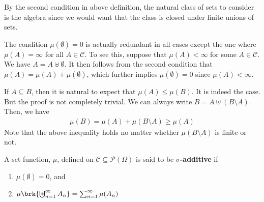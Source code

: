 \documentclass[thmcnt=section, 12pt, color=purple]{my-elegantbook}
\begin{document}
By the second condition in above definition, 
the natural class of sets to consider
is the algebra since we 
would want that the class is closed under finite unions of sets. 

\begin{note}
	The condition $\mu(\emptyset) = 0$
	is actually redundant in all cases except the one
	where $\mu(A) = \infty$ for all $A \in \mathcal{C}$.
	To see this, suppose that $\mu(A) < \infty$
	for some $A \in \mathcal{C}$.
	We have $A = A \uplus \emptyset$.
	It then follows from the second condition
	that $\mu(A) = \mu(A) + \mu(\emptyset)$,
	which further implies $\mu(\emptyset) = 0$
	since $\mu(A) < \infty$.
\end{note}

If $A \subseteq B$,
then it is natural to expect that $\mu(A) \leq \mu(B)$.
It is indeed the case.
But the proof is not completely trivial.
We can always write $B = A \uplus (B \setminus A)$.
Then, we have 
\begin{align*}
	\mu(B) = \mu(A) + \mu(B \setminus A)
	\geq \mu(A)
\end{align*}
Note that the above inequality holds
no matter whether $\mu(B \setminus A)$ is finite or not.


\begin{definition} \label{def:6}
	A set function, $\mu$, 
	defined on $\mathcal{C} \subseteq \mathcal{P}(\Omega)$
	is said to be \textbf{$\sigma$-additive}
	if
	\begin{enumerate}
		\item $\mu(\emptyset) = 0$, and 
		\item $\mu\brk{ \biguplus_{n=1}^\infty A_n } = \sum_{n=1}^\infty \mu(A_n)$
	\end{enumerate}
\end{definition}
\end{document}
